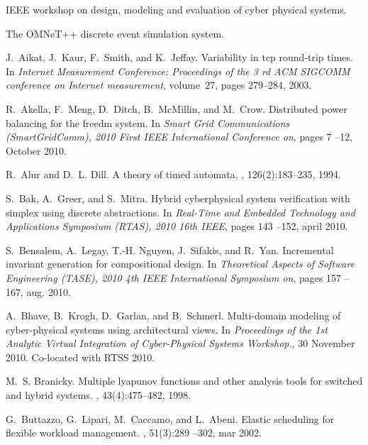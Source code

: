 \documentclass{sig-alternate-ipsn09}
\begin{document}
\begin{thebibliography}{10}

\setlength{\itemsep}{-0.01mm}
\footnotesize

{IEEE} workshop on design, modeling and evaluation of cyber physical systems.

The {OMNeT}++ discrete event simulation system.

J.~Aikat, J.~Kaur, F.~Smith, and K.~Jeffay.
\newblock Variability in tcp round-trip times.
\newblock In {\em Internet Measurement Conference: Proceedings of the 3 rd ACM
  SIGCOMM conference on Internet measurement}, volume~27, pages 279--284, 2003.

R.~Akella, F.~Meng, D.~Ditch, B.~McMillin, and M.~Crow.
\newblock Distributed power balancing for the freedm system.
\newblock In {\em Smart Grid Communications (SmartGridComm), 2010 First IEEE
  International Conference on}, pages 7 --12, October 2010.

R.~Alur and D.~L. Dill.
\newblock A theory of timed automata.
, 126(2):183--235, 1994.

S.~Bak, A.~Greer, and S.~Mitra.
\newblock Hybrid cyberphysical system verification with simplex using discrete
  abstractions.
\newblock In {\em Real-Time and Embedded Technology and Applications Symposium
  (RTAS), 2010 16th IEEE}, pages 143 --152, april 2010.

S.~Bensalem, A.~Legay, T.-H. Nguyen, J.~Sifakis, and R.~Yan.
\newblock Incremental invariant generation for compositional design.
\newblock In {\em Theoretical Aspects of Software Engineering (TASE), 2010 4th
  IEEE International Symposium on}, pages 157 --167, aug. 2010.

A.~Bhave, B.~Krogh, D.~Garlan, and B.~Schmerl.
\newblock Multi-domain modeling of cyber-physical systems using architectural
  views.
\newblock In {\em Proceedings of the 1st Analytic Virtual Integration of
  Cyber-Physical Systems Workshop.}, 30 November 2010.
\newblock Co-located with RTSS 2010.

M.~S. Branicky.
\newblock Multiple lyapunov functions and other analysis tools for switched and
  hybrid systems.
, 43(4):475--482, 1998.

G.~Buttazzo, G.~Lipari, M.~Caccamo, and L.~Abeni.
\newblock Elastic scheduling for flexible workload management.
, 51(3):289 --302, mar 2002.


\end{thebibliography}
\end{document}
